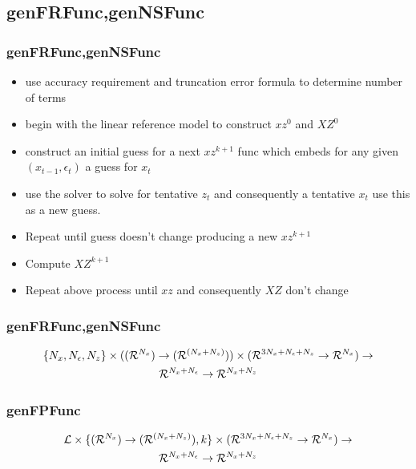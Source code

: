\documentclass[tikz]{beamer}
\begin{document}

\subsection{genFRFunc,genNSFunc}


\begin{frame}
\frametitle{genFRFunc,genNSFunc}
\label{sec:genfrfunc}
  \begin{itemize}
  \item use accuracy requirement and truncation error formula to determine number of terms
  \item begin with the linear reference model to construct $xz^0$ and $XZ^0$
  \item construct an initial guess for a next $xz^{k+1}$ func which embeds
for any given $(x_{t-1},\epsilon_t)$ a guess for $x_t$ 
  \item use the solver to solve for tentative $z_t$ and consequently 
a tentative $x_t$ use this as a new guess.  
\item Repeat until guess doesn't change producing  a new $xz^{k+1}$
\item Compute $XZ^{k+1}$
\item Repeat above process until $xz$ and consequently $XZ$ don't change
  \end{itemize}
\end{frame}


\begin{frame}
\frametitle{genFRFunc,genNSFunc}
\begin{gather*}
\{{N_x},{N_\epsilon},{N_z}\}\times({({\mathcal{R}^{{N_x}}})\rightarrow ({\mathcal{R}^{({{N_x}+{N_z}})}})})\times ({{\mathcal{R}^{3{N_x}+{N_\epsilon}+{N_z}}}\rightarrow{\mathcal{R}^{{N_x}}}})    \rightarrow\\
{{\mathcal{R}^{{N_x}+{N_\epsilon}}}\rightarrow{\mathcal{R}^{{N_x}+{N_z}}}}
\end{gather*}
\end{frame}

\begin{frame}
\frametitle{genFPFunc}
\label{sec:genfpfunc}
\begin{gather*}
{\mathcal{L}} \times \{  {({\mathcal{R}^{{N_x}}})\rightarrow ({\mathcal{R}^{({{N_x}+{N_z}})}})}, k \} \times ({{\mathcal{R}^{3{N_x}+{N_\epsilon}+{N_z}}}\rightarrow{\mathcal{R}^{{N_x}}}})    \rightarrow\\ 
{{\mathcal{R}^{{N_x}+{N_\epsilon}}}\rightarrow{\mathcal{R}^{{N_x}+{N_z}}}}
\end{gather*}

\end{frame}
\end{document}
